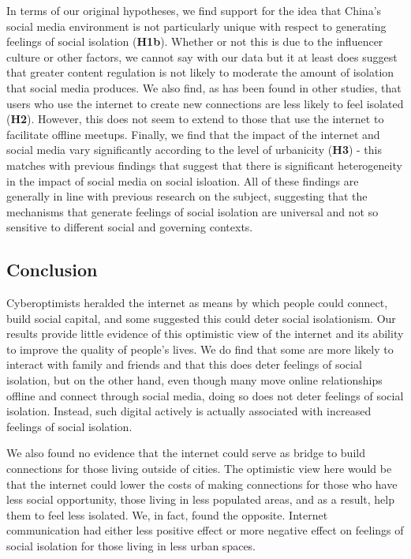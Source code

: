\documentclass[
  letterpaper,
  DIV=11,
  numbers=noendperiod]{scrartcl}
\begin{document}
In terms of our original hypotheses, we find support for the idea that
China's social media environment is not particularly unique with respect
to generating feelings of social isolation (\textbf{H1b}). Whether or
not this is due to the influencer culture or other factors, we cannot
say with our data but it at least does suggest that greater content
regulation is not likely to moderate the amount of isolation that social
media produces. We also find, as has been found in other studies, that
users who use the internet to create new connections are less likely to
feel isolated (\textbf{H2}). However, this does not seem to extend to
those that use the internet to facilitate offline meetups. Finally, we
find that the impact of the internet and social media vary significantly
according to the level of urbanicity (\textbf{H3}) - this matches with
previous findings that suggest that there is significant heterogeneity
in the impact of social media on social isloation. All of these findings
are generally in line with previous research on the subject, suggesting
that the mechanisms that generate feelings of social isolation are
universal and not so sensitive to different social and governing
contexts.

\hypertarget{conclusion}{%
\subsection{Conclusion}\label{conclusion}}

Cyberoptimists heralded the internet as means by which people could
connect, build social capital, and some suggested this could deter
social isolationism. Our results provide little evidence of this
optimistic view of the internet and its ability to improve the quality
of people's lives. We do find that some are more likely to interact with
family and friends and that this does deter feelings of social
isolation, but on the other hand, even though many move online
relationships offline and connect through social media, doing so does
not deter feelings of social isolation. Instead, such digital actively
is actually associated with increased feelings of social isolation.

We also found no evidence that the internet could serve as bridge to
build connections for those living outside of cities. The optimistic
view here would be that the internet could lower the costs of making
connections for those who have less social opportunity, those living in
less populated areas, and as a result, help them to feel less isolated.
We, in fact, found the opposite. Internet communication had either less
positive effect or more negative effect on feelings of social isolation
for those living in less urban spaces.
\end{document}
